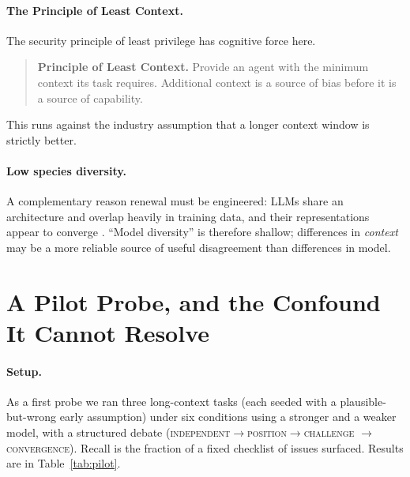 \documentclass[12pt]{article}
\begin{document}
\paragraph{The Principle of Least Context.} The security principle of least
privilege \citep{saltzer1975protection} has cognitive force here.

\begin{quote}
\textbf{Principle of Least Context.} Provide an agent with the minimum context
its task requires. Additional context is a source of bias before it is a source
of capability.
\end{quote}

This runs against the industry assumption that a longer context window is
strictly better.

\paragraph{Low species diversity.} A complementary reason renewal must be
engineered: LLMs share an architecture \citep{vaswani2017attention} and overlap
heavily in training data, and their representations appear to converge
\citep{huh2024platonic}. ``Model diversity'' is therefore shallow; differences
in \emph{context} may be a more reliable source of useful disagreement than
differences in model.

\section{A Pilot Probe, and the Confound It Cannot Resolve}
\label{sec:pilot}

\paragraph{Setup.} As a first probe we ran three long-context tasks (each
seeded with a plausible-but-wrong early assumption) under six conditions using a
stronger and a weaker model, with a structured debate
(\textsc{independent}$\rightarrow$\textsc{position}$\rightarrow$\textsc{challenge}
$\rightarrow$\textsc{convergence}). Recall is the fraction of a fixed checklist
of issues surfaced. Results are in Table~\ref{tab:pilot}.
\end{document}
